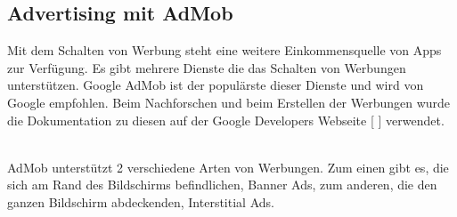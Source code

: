 \documentclass[FIPLY_base.tex]{subfiles}
\author{Andreas Denkmayr}
\date{25. Februar 2016}
\begin{document}
\subsection{Advertising mit AdMob}
Mit dem Schalten von Werbung steht eine weitere Einkommensquelle von Apps zur Verfügung.
Es gibt mehrere Dienste die das Schalten von Werbungen unterstützen.
Google AdMob ist der populärste dieser Dienste und wird von Google empfohlen.
Beim Nachforschen und beim Erstellen der Werbungen wurde die Dokumentation zu diesen auf der Google Developers Webseite [ \cite{gdAdMob}] verwendet. 

\ \\
AdMob unterstützt 2 verschiedene Arten von Werbungen. 
Zum einen gibt es, die sich am Rand des Bildschirms befindlichen, Banner Ads, zum anderen, die den ganzen Bildschirm abdeckenden, Interstitial Ads.
\ \\
\end{document}
